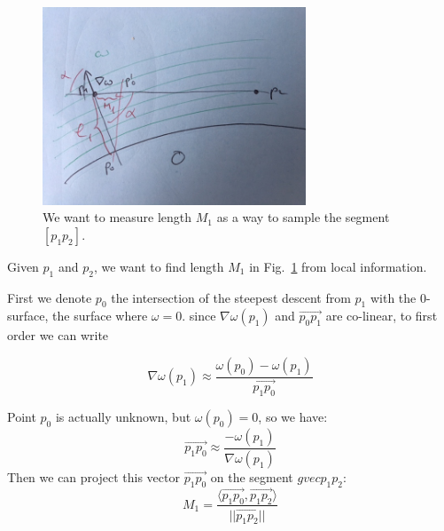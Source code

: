 \documentclass[11pt,a4paper]{article}
\newcommand{\gvec}[1]{\ensuremath{\overset{\rightarrow}{#1}}}
\newcommand{\scal}[2]{\ensuremath{\langle #1 , #2 \rangle}}
\begin{document}
\begin{figure}
	\centering
	\includegraphics[width=0.7\textwidth]{Images/blue_doodle.jpg}
	\caption{We want to measure length $M_1$ as a way to sample the segment $[p_1p_2]$.\label{fig:findM}}
\end{figure}


Given $p_1$ and $p_2$, we want to find length $M_1$ in Fig.~\ref{fig:findM} from local information.

First we denote $p_0$ the intersection of the steepest descent from $p_1$ with the 0-surface, the surface where $\omega=0$.  since $\nabla \omega(p_1)$ and $\gvec{p_0p_1}$ are co-linear, to first order we can write

\begin{equation}
\nabla \omega(p_1) \approx \frac{\omega(p_0) - \omega(p_1)}{\gvec{p_1p_0}}
\end{equation}



Point $p_0$ is actually unknown, but $\omega(p_0) = 0$, so we have:
\begin{equation}
\gvec{p_1p_0} \approx \frac{- \omega(p_1)}{\nabla\omega(p_1)}
\end{equation}
Then we can project this vector $\gvec{p_1p_0}$ on the segment $gvec{p_1p_2}$:
\begin{equation}
M_1 = \frac{\scal{\gvec{p_1p_0}}{\gvec{p_1p_2}}}{||\gvec{p_1p_2}||}
\end{equation}



%
\end{document}
